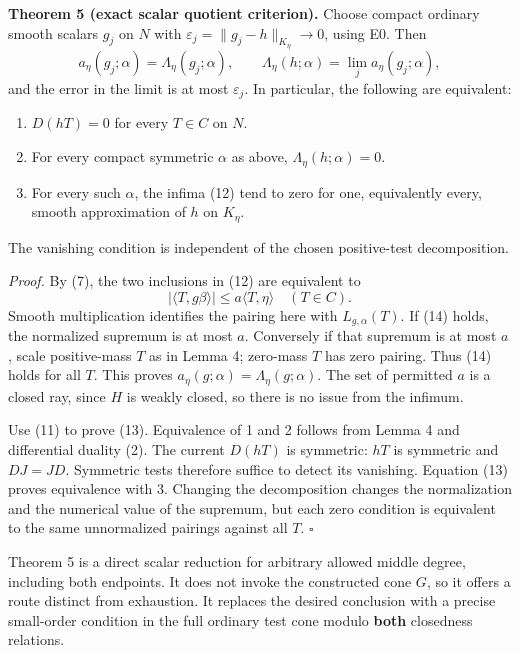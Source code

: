 \documentclass[
  11pt,
]{article}
\providecommand{\tightlist}{%
  \setlength{\itemsep}{0pt}\setlength{\parskip}{0pt}}
\begin{document}
\textbf{Theorem 5 (exact scalar quotient criterion).} Choose compact
ordinary smooth scalars \(g_j\) on \(N\) with
\(\varepsilon_j=\|g_j-h\|_{K_\eta}\to0\), using E0. Then \[
 a_\eta(g_j;\alpha)=\Lambda_\eta(g_j;\alpha),\qquad
 \Lambda_\eta(h;\alpha)=\lim_j a_\eta(g_j;\alpha),             \tag{13}
\] and the error in the limit is at most \(\varepsilon_j\). In
particular, the following are equivalent:

\begin{enumerate}
\def\labelenumi{\arabic{enumi}.}
\tightlist
\item
  \(D(hT)=0\) for every \(T\in C\) on \(N\).
\item
  For every compact symmetric \(\alpha\) as above,
  \(\Lambda_\eta(h;\alpha)=0\).
\item
  For every such \(\alpha\), the infima (12) tend to zero for one,
  equivalently every, smooth approximation of \(h\) on \(K_\eta\).
\end{enumerate}

The vanishing condition is independent of the chosen positive-test
decomposition.

\emph{Proof.} By (7), the two inclusions in (12) are equivalent to
\[|\langle T,g\beta\rangle|\leq a\langle T,\eta\rangle
                                                    \quad(T\in C). \tag{14}\]
Smooth multiplication identifies the pairing here with
\(L_{g,\alpha}(T)\). If (14) holds, the normalized supremum is at most
\(a\). Conversely if that supremum is at most \(a\), scale positive-mass
\(T\) as in Lemma 4; zero-mass \(T\) has zero pairing. Thus (14) holds
for all \(T\). This proves \(a_\eta(g;\alpha)=\Lambda_\eta(g;\alpha)\).
The set of permitted \(a\) is a closed ray, since \(H\) is weakly
closed, so there is no issue from the infimum.

Use (11) to prove (13). Equivalence of 1 and 2 follows from Lemma 4 and
differential duality (2). The current \(D(hT)\) is symmetric: \(hT\) is
symmetric and \(DJ=JD\). Symmetric tests therefore suffice to detect its
vanishing. Equation (13) proves equivalence with 3. Changing the
decomposition changes the normalization and the numerical value of the
supremum, but each zero condition is equivalent to the same unnormalized
pairings against all \(T\). \(\square\)

Theorem 5 is a direct scalar reduction for arbitrary allowed middle
degree, including both endpoints. It does not invoke the constructed
cone \(G\), so it offers a route distinct from exhaustion. It replaces
the desired conclusion with a precise small-order condition in the full
ordinary test cone modulo \textbf{both} closedness relations.
\end{document}
